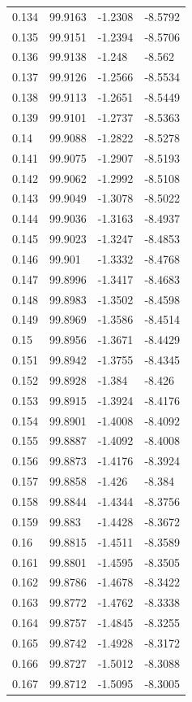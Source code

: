\begin{tabular}{llll}
0.134 & 99.9163 & -1.2308 & -8.5792 \\
0.135 & 99.9151 & -1.2394 & -8.5706 \\
0.136 & 99.9138 & -1.248 & -8.562 \\
0.137 & 99.9126 & -1.2566 & -8.5534 \\
0.138 & 99.9113 & -1.2651 & -8.5449 \\
0.139 & 99.9101 & -1.2737 & -8.5363 \\
0.14 & 99.9088 & -1.2822 & -8.5278 \\
0.141 & 99.9075 & -1.2907 & -8.5193 \\
0.142 & 99.9062 & -1.2992 & -8.5108 \\
0.143 & 99.9049 & -1.3078 & -8.5022 \\
0.144 & 99.9036 & -1.3163 & -8.4937 \\
0.145 & 99.9023 & -1.3247 & -8.4853 \\
0.146 & 99.901 & -1.3332 & -8.4768 \\
0.147 & 99.8996 & -1.3417 & -8.4683 \\
0.148 & 99.8983 & -1.3502 & -8.4598 \\
0.149 & 99.8969 & -1.3586 & -8.4514 \\
0.15 & 99.8956 & -1.3671 & -8.4429 \\
0.151 & 99.8942 & -1.3755 & -8.4345 \\
0.152 & 99.8928 & -1.384 & -8.426 \\
0.153 & 99.8915 & -1.3924 & -8.4176 \\
0.154 & 99.8901 & -1.4008 & -8.4092 \\
0.155 & 99.8887 & -1.4092 & -8.4008 \\
0.156 & 99.8873 & -1.4176 & -8.3924 \\
0.157 & 99.8858 & -1.426 & -8.384 \\
0.158 & 99.8844 & -1.4344 & -8.3756 \\
0.159 & 99.883 & -1.4428 & -8.3672 \\
0.16 & 99.8815 & -1.4511 & -8.3589 \\
0.161 & 99.8801 & -1.4595 & -8.3505 \\
0.162 & 99.8786 & -1.4678 & -8.3422 \\
0.163 & 99.8772 & -1.4762 & -8.3338 \\
0.164 & 99.8757 & -1.4845 & -8.3255 \\
0.165 & 99.8742 & -1.4928 & -8.3172 \\
0.166 & 99.8727 & -1.5012 & -8.3088 \\
0.167 & 99.8712 & -1.5095 & -8.3005 \\

\end{tabular}
